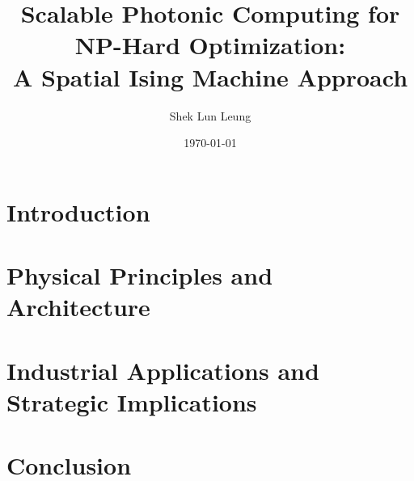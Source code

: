 \documentclass[twocolumn, 10pt, a4paper]{article}
\title{\textbf{Scalable Photonic Computing for NP-Hard Optimization: \\ A Spatial Ising Machine Approach}}
\author{Shek Lun Leung}
\date{\today}
\begin{document}
\maketitle



\section{Introduction}


\section{Physical Principles and Architecture}






\section{Industrial Applications and Strategic Implications}


\section{Conclusion}



 
\end{document}
